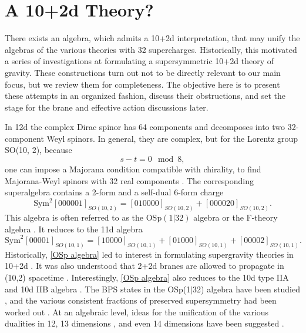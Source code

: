 \section{A 10+2d Theory?}
There exists an algebra, which admits a 10+2d interpretation, that may unify the algebras of the various theories with 32 supercharges. 
Historically, this motivated a series of investigations at formulating a supersymmetric 10+2d theory of gravity.
These constructions turn out not to be directly relevant to our main focus, but we review them for completeness.
The objective here is to present these attempts in an organized fashion, discuss their obstructions, and set the stage for the brane and effective action discussions later.

In 12d the complex Dirac spinor has 64 components and decomposes into two 32-component Weyl spinors.
In general, they are complex, but for the Lorentz group SO(10, 2), because
\begin{equation}
s-t=0\mod 8,
\end{equation}
one can impose a Majorana condition compatible with chirality, to find Majorana-Weyl spinors with 32 real components \cite{VanProeyen:1999ni}.
The corresponding superalgebra contains a 2-form and a self-dual 6-form charge
\cite{vanHolten:1982mx}
\begin{equation}
\text{Sym}^2[000001]_{SO(10, 2)} = [010000]_{SO(10, 2)} + [000020]_{SO(10, 2)}.
\label{OSp algebra}
\end{equation}
This algebra is often referred to as the $\mathrm{OSp}(1|32)$ algebra \cite{Bergshoeff:2000qu} or the F-theory algebra \cite{Hewson:1999tf}.
It reduces to the 11d algebra
\begin{equation}
\text{Sym}^2[00001]_{SO(10,1)} = [10000]_{SO(10,1)} + [01000]_{SO(10,1)} + [00002]_{SO(10,1)}.
\end{equation}
Historically, \eqref{OSp algebra} led to interest in formulating supergravity theories in 10+2d \cite{Castellani:1982ke}.
It was also understood that 2+2d branes are allowed to propagate in (10,2) spacetime \cite{Blencowe:1988sk}.
Interestingly, \eqref{OSp algebra} also reduces to the 10d type IIA and 10d IIB algebra \cite{Bergshoeff:2000qu,Bergshoeff:2000vg,Bergshoeff:2000vh}.
The BPS states in the OSp(1$|$32) algebra have been studied \cite{Ueno:1999xa}, and the various consistent fractions of preserved supersymmetry had been worked out \cite{Manvelyan:1998kx}.
At an algebraic level, ideas for the unification of the various dualities in 12, 13 dimensions \cite{Bars:1996dz,Bars:1996us,Bars:1996ab,Bars:1996hr}, and even 14 dimensions have been suggested \cite{Rudychev:1997ui,Bars:1997ug}.

